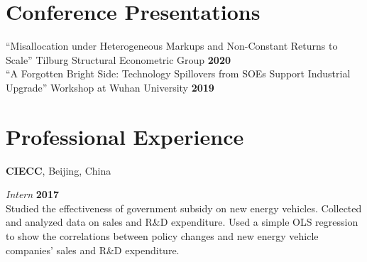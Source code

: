 \documentclass[margin,line]{res}
\newenvironment{list2}{
  \begin{list}{$\bullet$}{%
      \setlength{\itemsep}{0in}
      \setlength{\parsep}{0in} \setlength{\parskip}{0in}
      \setlength{\topsep}{0in} \setlength{\partopsep}{0in} 
      \setlength{\leftmargin}{0.2in}}}{\end{list}}
\begin{document}
\begin{resume}
%

\section{\sc Conference Presentations}
``Misallocation under Heterogeneous Markups and Non-Constant Returns to Scale''
Tilburg Structural Econometric Group \hfill {\bf 2020}\\
``A Forgotten Bright Side: Technology Spillovers from SOEs Support
Industrial Upgrade''
Workshop at Wuhan University \hfill {\bf 2019}\\

\section{\sc Professional Experience}
{\bf CIECC}, Beijing, China

\vspace{-.3cm}
{\em Intern} \hfill {\bf 2017}\\
Studied the effectiveness of government subsidy on new energy vehicles. Collected and analyzed data on sales and R\&D expenditure. Used a simple OLS regression to show the correlations between policy changes and new energy vehicle companies’ sales and R\&D expenditure.


\end{resume}
\end{document}
